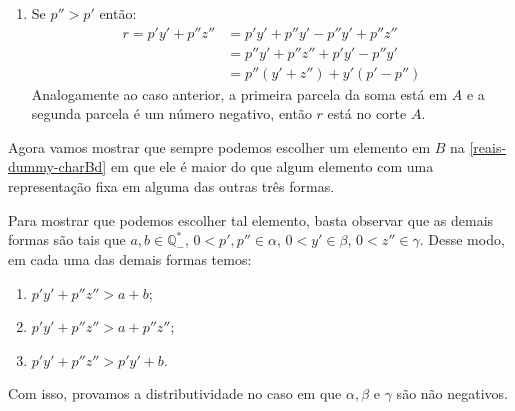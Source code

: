 \documentclass[../main.tex]{subfiles}
\begin{document}
\begin{dem}
\begin{enumerate}
        \item Se $p'' > p'$ então:
            \begin{align*}
                r = p'y' + p''z'' &= p'y' + p''y' - p''y' + p''z'' \\
                &= p''y' + p''z'' + p'y' - p''y' \\
                &= p''(y'+z'') + y'(p'-p'')
            \end{align*}
            Analogamente ao caso anterior, a primeira parcela da soma está em $A$ e a segunda parcela é um número negativo, então $r$ está no corte $A$.
    \end{enumerate}
    Agora vamos mostrar que sempre podemos escolher um elemento em $B$ na \ref{reais-dummy-charBd} em que ele é maior do que algum elemento com uma representação fixa em alguma das outras três formas.
    
    Para mostrar que podemos escolher tal elemento, basta observar que as demais formas são tais que $a, b \in \mathbb{Q}_{-}^*$, $0 < p',p'' \in \alpha$, $0 <  y' \in \beta$, $0 < z'' \in \gamma$. Desse modo, em cada uma das demais formas temos:

      \begin{enumerate}[label=(\roman*)]
        \item $p'y' + p''z'' > a + b $; 
        \item $p'y' + p''z'' > a + p''z''$; 
        \item $p'y' + p''z'' > p'y' + b$.
    \end{enumerate}

    Com isso, provamos a distributividade no caso em que $\alpha, \beta$ e $\gamma$ são não negativos.


\end{dem}
\end{document}
